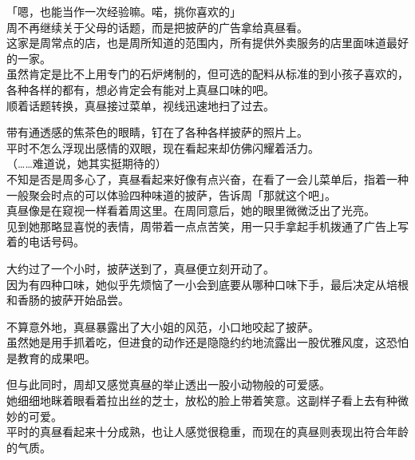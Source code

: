 「嗯，也能当作一次经验嘛。喏，挑你喜欢的」\\

周不再继续关于父母的话题，而是把披萨的广告拿给真昼看。\\

这家是周常点的店，也是周所知道的范围内，所有提供外卖服务的店里面味道最好的一家。\\

虽然肯定是比不上用专门的石炉烤制的，但可选的配料从标准的到小孩子喜欢的，各种各样的都有，想必肯定会有能对上真昼口味的吧。\\

顺着话题转换，真昼接过菜单，视线迅速地扫了过去。

带有通透感的焦茶色的眼睛，钉在了各种各样披萨的照片上。\\

平时不怎么浮现出感情的双眼，现在看起来却仿佛闪耀着活力。\\

（……难道说，她其实挺期待的）\\

不知是否是周多心了，真昼看起来好像有点兴奋，在看了一会儿菜单后，指着一种一般聚会时点的可以体验四种味道的披萨，告诉周「那就这个吧」。\\

真昼像是在窥视一样看着周这里。在周同意后，她的眼里微微泛出了光亮。\\

见到她那略显喜悦的表情，周带着一点点苦笑，用一只手拿起手机拨通了广告上写着的电话号码。\\

\vspace{2\baselineskip}

大约过了一个小时，披萨送到了，真昼便立刻开动了。\\

因为有四种口味，她似乎先烦恼了一小会到底要从哪种口味下手，最后决定从培根和香肠的披萨开始品尝。

不算意外地，真昼暴露出了大小姐的风范，小口地咬起了披萨。\\

虽然她是用手抓着吃，但进食的动作还是隐隐约约地流露出一股优雅风度，这恐怕是教育的成果吧。

但与此同时，周却又感觉真昼的举止透出一股小动物般的可爱感。\\

她细细地眯着眼看着拉出丝的芝士，放松的脸上带着笑意。这副样子看上去有种微妙的可爱。\\

平时的真昼看起来十分成熟，也让人感觉很稳重，而现在的真昼则表现出符合年龄的气质。

